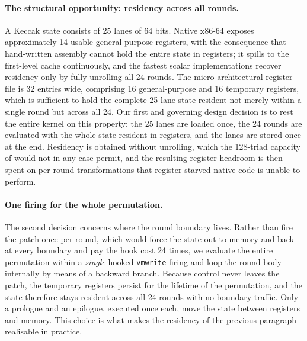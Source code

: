\paragraph{The structural opportunity: residency across all rounds.}
A Keccak state consists of 25 lanes of 64 bits. Native x86-64 exposes
approximately 14 usable general-purpose registers, with the consequence that
hand-written assembly cannot hold the entire state in registers; it spills to
the first-level cache continuously, and the fastest scalar implementations
recover residency only by fully unrolling all 24 rounds. The
micro-architectural register file is 32 entries wide, comprising 16
general-purpose and 16 temporary registers, which is sufficient to hold the
complete 25-lane state resident not merely within a single round but across all
24. Our first and governing design decision is to rest the entire kernel on
this property: the 25 lanes are loaded once, the 24 rounds are evaluated with
the whole state resident in registers, and the lanes are stored once at the
end. Residency is obtained without unrolling, which the 128-triad capacity of
 would not in any case permit, and the resulting register
headroom is then spent on per-round transformations that register-starved
native code is unable to perform.

\paragraph{One firing for the whole permutation.}
The second decision concerns where the round boundary lives. Rather than fire
the patch once per round, which would force the state out to memory and back at
every boundary and pay the hook cost 24 times, we evaluate the entire
permutation within a \emph{single} hooked \texttt{vmwrite} firing and loop the
round body internally by means of a backward branch. Because control never
leaves the patch, the temporary registers persist for the lifetime of the
permutation, and the state therefore stays resident across all 24 rounds with
no boundary traffic. Only a prologue and an epilogue, executed once each, move
the state between registers and memory. This choice is what makes the residency
of the previous paragraph realisable in practice.

